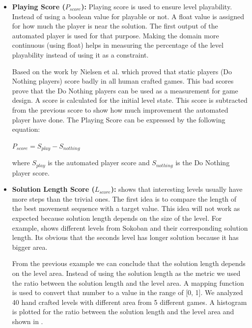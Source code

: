 \begin{itemize}
	\item \textbf{Playing Score ($P_{score}$):} Playing score is used to ensure level playability. Instead of using a boolean value for playable or not. A float value is assigned for how much the player is near the solution. The first output of the automated player is used for that purpose. Making the domain more continuous (using float) helps in measuring the percentage of the level playability instead of using it as a constraint.\\\par
	
	Based on the work by Nielsen et al.\cite{gvgpPerformanceProfiles} which proved that static players (Do Nothing players) score badly in all human crafted games. This bad scores prove that the Do Nothing players can be used as a measurement for game design. A score is calculated for the initial level state. This score is subtracted from the previous score to show how much improvement the automated player have done. The Playing Score can be expressed by the following equation:
	\begin{center}$ P_{score} = S_{play} - S_{nothing}$\end{center}
	where $S_{play}$ is the automated player score and $S_{nothing}$ is the Do Nothing player score.
	
	\item\textbf{Solution Length Score ($L_{score}$):}  shows that interesting levels usually have more steps than the trivial ones. The first idea is to compare the length of the best movement sequence with a target value. This idea will not work as expected because solution length depends on the size of the level. For example,  shows different levels from Sokoban and their corresponding solution length. Its obvious that the seconds level has longer solution because it has bigger area.
	
	
	From the previous example we can conclude that the solution length depends on the level area. Instead of using the solution length as the metric we used the ratio between the solution length and the level area. A mapping function is used to convert that number to a value in the range of [0, 1]. We analyzed 40 hand crafted levels with different area from 5 different games. A histogram is plotted for the ratio between the solution length and the level area and shown in .
	

\end{itemize}
